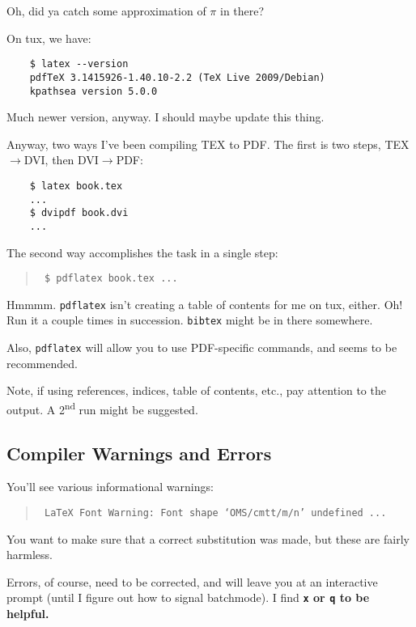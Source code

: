Oh, did ya catch some approximation of $\pi$ in there?

On tux, we have:

\begin{verbatim}
	$ latex --version
	pdfTeX 3.1415926-1.40.10-2.2 (TeX Live 2009/Debian)
	kpathsea version 5.0.0
\end{verbatim}

Much newer version, anyway.  I should maybe update this thing.

Anyway, two ways I've been compiling TEX to PDF.  The first is two steps,
TEX$\rightarrow$DVI, then DVI$\rightarrow$PDF:

\begin{verbatim}
	$ latex book.tex
	...
	$ dvipdf book.dvi
	...
\end{verbatim}

The second way accomplishes the task in a single step:

\begin{quote}
	\texttt{
		\$ pdflatex book.tex
		...
	}
\end{quote}

Hmmmm.  \texttt{pdflatex} isn't creating a table of contents for me on tux,
either.  Oh!  Run it a couple times in succession.  \texttt{bibtex} might be
in there somewhere.

Also, \texttt{pdflatex} will allow you to use PDF-specific commands, and
seems to be recommended.

Note, if using references, indices, table of contents, etc., pay attention
to the output.  A 2\textsuperscript{nd} run might be suggested.

\subsection{Compiler Warnings and Errors}

You'll see various informational warnings:

\begin{quote}
	\texttt{
		LaTeX Font Warning: Font shape `OMS/cmtt/m/n' undefined
		...
	}
\end{quote}

You want to make sure that a correct substitution was made, but these are
fairly harmless.

Errors, of course, need to be corrected, and will leave you at an
interactive prompt (until I figure out how to signal batchmode).  I find
\bf{\texttt{x}} or \bf{\texttt{q}} to be helpful.

